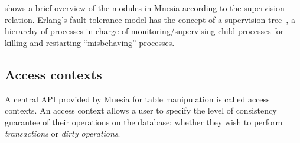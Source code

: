 shows a brief overview of the modules in Mnesia according
to the supervision relation.
Erlang's fault tolerance model has the concept of a supervision tree~\cite{ericssonab2023otpdesign},
a hierarchy of processes in charge of monitoring/supervising child processes
for killing and restarting ``misbehaving'' processes. 






\subsection{Access contexts} \label{subsec:mnesia access contexts}

A central API provided by Mnesia for table manipulation is called access
contexts. An access context allows a user to specify the level of consistency 
guarantee of their operations on the database: whether they wish to perform
\emph{transactions} or \emph{dirty operations}.

